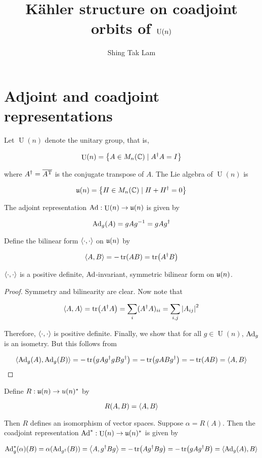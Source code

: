 \documentclass{article}
\title{K\"ahler structure on coadjoint orbits of \(\U(n)\)}
\author{Shing Tak Lam}
\DeclareMathOperator{\U}{U}
\renewcommand{\u}{\mfu}
\begin{document}
\maketitle

\section{Adjoint and coadjoint representations}

Let \(\U(n)\) denote the unitary group, that is,

\[\U(n) = \left\{A \in M_n(\C) \mid A^\dagger A = I\right\}\]

where \(A^\dagger = \overline{A^{\mathrm{T}}}\) is the conjugate transpose of \(A\). The Lie algebra of \(\U(n)\) is

\[\u(n) = \left\{H \in M_n(\C) \mid H + H^\dagger = 0\right\}\]

The adjoint representation \(\Ad : \U(n) \to \u(n)\) is given by

\[\operatorname{Ad}_g(A) = gAg^{-1} = gAg^\dagger\]

Define the bilinear form \(\left\langle \cdot, \cdot \right\rangle\) on \(\u(n)\) by

\[\left\langle A, B \right\rangle = -\tr(AB) = \tr(A^\dagger B)\]

\begin{lemma}
    \(\left\langle \cdot, \cdot \right\rangle\) is a positive definite, \(\operatorname{Ad}\)-invariant, symmetric bilinear form on \(\u(n)\).
\end{lemma}

\begin{proof}
    Symmetry and bilinearity are clear. Now note that

    \[\left\langle A, A \right\rangle = \tr(A^\dagger A) = \sum_i (A^\dagger A)_{ii} = \sum_{i, j}\abs{A_{ij}}^2\]

    Therefore, \(\left\langle \cdot, \cdot \right\rangle\) is positive definite. Finally, we show that for all \(g \in \U(n)\), \(\operatorname{Ad}_g\) is an isometry. But this follows from

    \[\left\langle \operatorname{Ad}_g(A), \operatorname{Ad}_g(B) \right\rangle = -\tr(gAg^\dagger g Bg^\dagger) = -\tr(gABg^\dagger) = -\tr(AB) = \left\langle A, B \right\rangle\]
\end{proof}

Define \(R : \u(n) \to u(n)^*\) by

\[R(A, B) = \left\langle A, B \right\rangle\]

Then \(R\) defines an isomorphism of vector spaces. Suppose \(\alpha = R(A)\). Then the coadjoint representation \(\Ad^* : \U(n) \to \u(n)^*\) is given by

\[\operatorname{Ad}_g^*(\alpha)(B) = \alpha(\operatorname{Ad}_{g^\dagger}(B)) = \left\langle A, g^\dagger B g \right\rangle = -\tr(Ag^\dagger B g) = -\tr(gAg^\dagger B) = \left\langle \operatorname{Ad}_g(A), B \right\rangle\]
\end{document}
